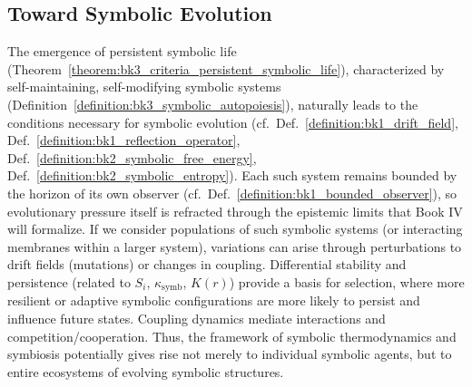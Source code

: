 \subsection{Toward Symbolic Evolution}

\begin{remark} \label{remark:bk3_toward_symbolic_evolution}
The emergence of persistent symbolic life (Theorem~\ref{theorem:bk3_criteria_persistent_symbolic_life}), characterized by self-maintaining, self-modifying symbolic systems (Definition~\ref{definition:bk3_symbolic_autopoiesis}), naturally leads to the conditions necessary for symbolic evolution (cf.~Def.~\ref{definition:bk1_drift_field}, Def.~\ref{definition:bk1_reflection_operator}, Def.~\ref{definition:bk2_symbolic_free_energy}, Def.~\ref{definition:bk2_symbolic_entropy}). Each such system remains bounded by the horizon of its own observer (cf.~Def.~\ref{definition:bk1_bounded_observer}), so evolutionary pressure itself is refracted through the epistemic limits that Book IV will formalize. If we consider populations of such symbolic systems (or interacting membranes within a larger system), variations can arise through perturbations to drift fields (mutations) or changes in coupling. Differential stability and persistence (related to $S_i$, $\kappa_{\text{symb}}$, $K(r)$) provide a basis for selection, where more resilient or adaptive symbolic configurations are more likely to persist and influence future states. Coupling dynamics mediate interactions and competition/cooperation. Thus, the framework of symbolic thermodynamics and symbiosis potentially gives rise not merely to individual symbolic agents, but to entire ecosystems of evolving symbolic structures.
\end{remark}
